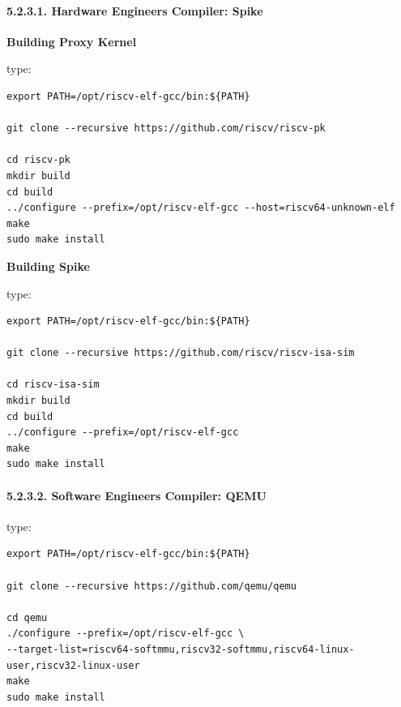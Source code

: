 \documentclass[
]{article}
\begin{document}
\hypertarget{hardware-engineers-compiler-spike}{%
\paragraph{5.2.3.1. Hardware Engineers Compiler:
Spike}\label{hardware-engineers-compiler-spike}}

\textbf{Building Proxy Kernel}

type:

\begin{verbatim}
export PATH=/opt/riscv-elf-gcc/bin:${PATH}

git clone --recursive https://github.com/riscv/riscv-pk

cd riscv-pk
mkdir build
cd build
../configure --prefix=/opt/riscv-elf-gcc --host=riscv64-unknown-elf
make
sudo make install
\end{verbatim}

\textbf{Building Spike}

type:

\begin{verbatim}
export PATH=/opt/riscv-elf-gcc/bin:${PATH}

git clone --recursive https://github.com/riscv/riscv-isa-sim

cd riscv-isa-sim
mkdir build
cd build
../configure --prefix=/opt/riscv-elf-gcc
make
sudo make install
\end{verbatim}

\hypertarget{software-engineers-compiler-qemu}{%
\paragraph{5.2.3.2. Software Engineers Compiler:
QEMU}\label{software-engineers-compiler-qemu}}

type:

\begin{verbatim}
export PATH=/opt/riscv-elf-gcc/bin:${PATH}

git clone --recursive https://github.com/qemu/qemu

cd qemu
./configure --prefix=/opt/riscv-elf-gcc \
--target-list=riscv64-softmmu,riscv32-softmmu,riscv64-linux-user,riscv32-linux-user
make
sudo make install
\end{verbatim}
\end{document}
